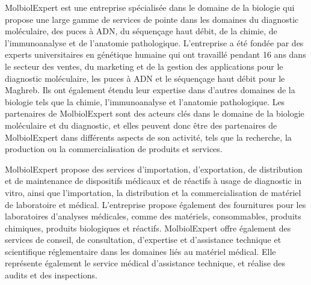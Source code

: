 \begin{flushleft}
	MolbiolExpert est une entreprise spécialisée dans le domaine de la biologie qui propose une large gamme de services de pointe dans les domaines du diagnostic moléculaire, des puces à ADN, du séquençage haut débit, de la chimie, de l'immunoanalyse et de l'anatomie pathologique. L'entreprise a été fondée par des experts universitaires en génétique humaine qui ont travaillé pendant 16 ans dans le secteur des ventes, du marketing et de la gestion des applications pour le diagnostic moléculaire, les puces à ADN et le séquençage haut débit pour le Maghreb. Ils ont également étendu leur expertise dans d'autres domaines de la biologie tels que la chimie, l'immunoanalyse et l'anatomie pathologique. Les partenaires de MolbiolExpert sont des acteurs clés dans le domaine de la biologie moléculaire et du diagnostic, et elles peuvent donc être des partenaires de MolbiolExpert dans différents aspects de son activité, tels que la recherche, la production ou la commercialisation de produits et services.
	
	MolbiolExpert propose des services d'importation, d'exportation, de distribution et de maintenance de dispositifs médicaux et de réactifs à usage de diagnostic in vitro, ainsi que l'importation, la distribution et la commercialisation de matériel de laboratoire et médical. L'entreprise propose également des fournitures pour les laboratoires d'analyses médicales, comme des matériels, consommables, produits chimiques, produits biologiques et réactifs. MolbiolExpert offre également des services de conseil, de consultation, d'expertise et d'assistance technique et scientifique réglementaire dans les domaines liés au matériel médical. Elle représente également le service médical d'assistance technique, et réalise des audits et des inspections.	
	\newpage
\end{flushleft}





